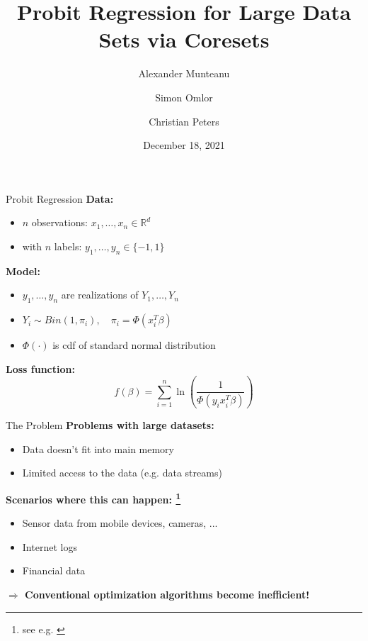 \documentclass[gray]{beamer}
\title{Probit Regression for Large Data Sets via Coresets}
\author{Alexander Munteanu \and Simon Omlor \and Christian Peters}
\institute{TU Dortmund University, Germany}
\date{December 18, 2021}
\begin{document}
\begin{frame}[noframenumbering]
    \thispagestyle{empty}
    \maketitle
\end{frame}

\begin{frame}{Probit Regression}
    \textbf{Data:}
    \begin{itemize}
        \item $n$ observations: $x_1, \ldots, x_n \in \mathbb{R}^d$ \\
        \item with $n$ labels: $y_1, \ldots, y_n \in \{-1, 1\}$
    \end{itemize}

    \vspace{\fill}

    \textbf{Model:}
    \begin{itemize}
        \item $y_1, \ldots, y_n$ are realizations of $Y_1, \ldots, Y_n$
        \item $Y_i \sim Bin(1, \pi_i), \quad \pi_i = \Phi(x_i^T \beta)$
        \item $\Phi(\cdot)$ is cdf of standard normal distribution
    \end{itemize}

    \vspace{\fill}

    \textbf{Loss function:}
    \begin{equation*}
        f(\beta) = \sum_{i=1}^n \ln\left( \frac{1}{\Phi(y_ix_i^T\beta)} \right)
    \end{equation*}
\end{frame}

\begin{frame}{The Problem}
    \textbf{Problems with large datasets:}
    \begin{itemize}
        \item Data doesn't fit into main memory
        \item Limited access to the data (e.g. data streams)
    \end{itemize}

    \vspace{\fill}

    \textbf{Scenarios where this can happen:%
        \footnote{see e.g. \cite{big-data-tiny-data}}}
    \begin{itemize}
        \item Sensor data from mobile devices, cameras, ...
        \item Internet logs
        \item Financial data
    \end{itemize}

    \vspace{\fill}

    \textbf{$\Rightarrow$ Conventional optimization algorithms become inefficient!}
\end{frame}
\end{document}
